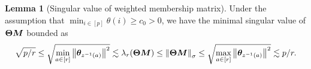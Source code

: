 \documentclass[lettersize,journal]{IEEEtran}
\theoremstyle{definition}
\newtheorem{lem}{Lemma}
\theoremstyle{definition}
\newcommand{\ang}[1]{\left\langle#1\right\rangle}
\def\fixme#1#2{\textbf{\color{red}[FIXME (#1): #2]}}
\begin{document}


\begin{lem}[Singular value of weighted membership matrix]\label{lem:singular_thetam} Under the assumption that $\min_{i \in [p]} \theta(i) \geq c_0 >0$, we have the minimal singular value of $\boldsymbol{\Theta} \bm M$ bounded as 
\begin{equation}\label{eq:membership2}
     \sqrt{p/r} \leq \sqrt{ \min_{a \in [r]}\onorm{ \mtheta_{ z^{-1}(a)} }^2 }  \lesssim \lambda_{r}(\mTheta \mM) \leq \onorm{\mTheta \mM}_{\sigma} \leq\sqrt{ \max_{a \in [r]}\onorm{ \mtheta_{ z^{-1}(a)} }^2 } \lesssim  p /r .
\end{equation}
\end{lem}
\end{document}
